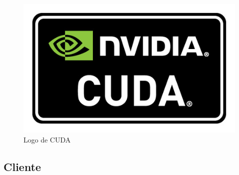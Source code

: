 \begin{itemize}
		\bigskip
		\begin{figure}[h]
			\centering
			\includegraphics[width=0.3\linewidth]{../images/cudalogo}
			\caption[Logo de CUDA]{Logo de CUDA}
			\label{fig:cudalogo}
		\end{figure}
	
			
\end{itemize}
	

\newpage
\subsection{Cliente}
\bigskip


